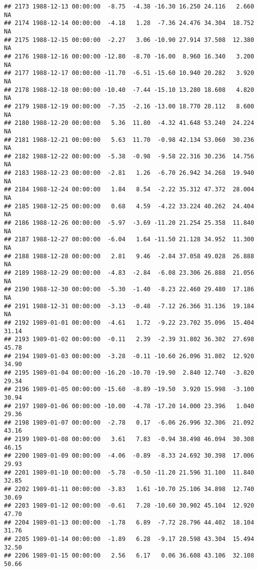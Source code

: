 \documentclass{article}\usepackage{graphicx, color}
\makeatletter
\newenvironment{kframe}{%
 \def\at@end@of@kframe{}%
 \ifinner\ifhmode%
  \def\at@end@of@kframe{\end{minipage}}%
  \begin{minipage}{\columnwidth}%
 \fi\fi%
 \def\FrameCommand##1{\hskip\@totalleftmargin \hskip-\fboxsep
 \colorbox{shadecolor}{##1}\hskip-\fboxsep
     \hskip-\linewidth \hskip-\@totalleftmargin \hskip\columnwidth}%
 \MakeFramed {\advance\hsize-\width
   \@totalleftmargin\z@ \linewidth\hsize
   \@setminipage}}%
 {\par\unskip\endMakeFramed%
 \at@end@of@kframe}
\newenvironment{knitrout}{}{} %
\makeatother
\begin{document}
\begin{knitrout}
\begin{kframe}
\begin{verbatim}
## 2173 1988-12-13 00:00:00  -8.75  -4.38 -16.30 16.250 24.116   2.660     NA
## 2174 1988-12-14 00:00:00  -4.18   1.28  -7.36 24.476 34.304  18.752     NA
## 2175 1988-12-15 00:00:00  -2.27   3.06 -10.90 27.914 37.508  12.380     NA
## 2176 1988-12-16 00:00:00 -12.80  -8.70 -16.00  8.960 16.340   3.200     NA
## 2177 1988-12-17 00:00:00 -11.70  -6.51 -15.60 10.940 20.282   3.920     NA
## 2178 1988-12-18 00:00:00 -10.40  -7.44 -15.10 13.280 18.608   4.820     NA
## 2179 1988-12-19 00:00:00  -7.35  -2.16 -13.00 18.770 28.112   8.600     NA
## 2180 1988-12-20 00:00:00   5.36  11.80  -4.32 41.648 53.240  24.224     NA
## 2181 1988-12-21 00:00:00   5.63  11.70  -0.98 42.134 53.060  30.236     NA
## 2182 1988-12-22 00:00:00  -5.38  -0.98  -9.58 22.316 30.236  14.756     NA
## 2183 1988-12-23 00:00:00  -2.81   1.26  -6.70 26.942 34.268  19.940     NA
## 2184 1988-12-24 00:00:00   1.84   8.54  -2.22 35.312 47.372  28.004     NA
## 2185 1988-12-25 00:00:00   0.68   4.59  -4.22 33.224 40.262  24.404     NA
## 2186 1988-12-26 00:00:00  -5.97  -3.69 -11.20 21.254 25.358  11.840     NA
## 2187 1988-12-27 00:00:00  -6.04   1.64 -11.50 21.128 34.952  11.300     NA
## 2188 1988-12-28 00:00:00   2.81   9.46  -2.84 37.058 49.028  26.888     NA
## 2189 1988-12-29 00:00:00  -4.83  -2.84  -6.08 23.306 26.888  21.056     NA
## 2190 1988-12-30 00:00:00  -5.30  -1.40  -8.23 22.460 29.480  17.186     NA
## 2191 1988-12-31 00:00:00  -3.13  -0.48  -7.12 26.366 31.136  19.184     NA
## 2192 1989-01-01 00:00:00  -4.61   1.72  -9.22 23.702 35.096  15.404  31.14
## 2193 1989-01-02 00:00:00  -0.11   2.39  -2.39 31.802 36.302  27.698  45.78
## 2194 1989-01-03 00:00:00  -3.28  -0.11 -10.60 26.096 31.802  12.920  34.90
## 2195 1989-01-04 00:00:00 -16.20 -10.70 -19.90  2.840 12.740  -3.820  29.34
## 2196 1989-01-05 00:00:00 -15.60  -8.89 -19.50  3.920 15.998  -3.100  30.94
## 2197 1989-01-06 00:00:00 -10.00  -4.78 -17.20 14.000 23.396   1.040  29.36
## 2198 1989-01-07 00:00:00  -2.78   0.17  -6.06 26.996 32.306  21.092  43.16
## 2199 1989-01-08 00:00:00   3.61   7.83  -0.94 38.498 46.094  30.308  46.15
## 2200 1989-01-09 00:00:00  -4.06  -0.89  -8.33 24.692 30.398  17.006  29.93
## 2201 1989-01-10 00:00:00  -5.78  -0.50 -11.20 21.596 31.100  11.840  32.85
## 2202 1989-01-11 00:00:00  -3.83   1.61 -10.70 25.106 34.898  12.740  30.69
## 2203 1989-01-12 00:00:00  -0.61   7.28 -10.60 30.902 45.104  12.920  47.70
## 2204 1989-01-13 00:00:00  -1.78   6.89  -7.72 28.796 44.402  18.104  31.76
## 2205 1989-01-14 00:00:00  -1.89   6.28  -9.17 28.598 43.304  15.494  32.50
## 2206 1989-01-15 00:00:00   2.56   6.17   0.06 36.608 43.106  32.108  50.66

\end{verbatim}
\end{kframe}
\end{knitrout}
\end{document}

